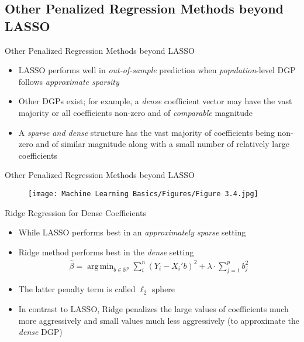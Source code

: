 \documentclass[aspectratio=1610,12pt,xcolor=dvipsnames]{beamer}
\DeclareMathOperator*{\argmin}{arg\,min}
\begin{document}
\subsection{Other Penalized Regression Methods beyond LASSO}

\begin{frame}
  \subsectionpage
\end{frame}

\begin{frame}{Other Penalized Regression Methods beyond LASSO}

\begin{itemize}
    \item LASSO performs well in \textit{out-of-sample} prediction when \textit{population}-level DGP follows \textit{approximate sparsity}
    \item Other DGPs exist; for example, a \textit{dense} coefficient vector may have the vast majority or all coefficients non-zero and of \textit{comparable} magnitude
    \item A \textit{sparse and dense} structure has the vast majority of coefficients being non-zero and of similar magnitude along with a small number of relatively large coefficients
\end{itemize}
\end{frame}

\begin{frame}{Other Penalized Regression Methods beyond LASSO}

\begin{figure}
    \centering
    \texttt{[image: Machine Learning Basics/Figures/Figure 3.4.jpg]}
    \label{fig:figure 3.4}
\end{figure}
\end{frame}

\begin{frame}{Ridge Regression for Dense Coefficients}

\begin{itemize}
    \item While LASSO performs best in an \textit{approximately sparse} setting
    \item Ridge method performs best in the \textit{dense} setting
    \begin{align*}
        \hat \beta = \argmin_{b\in\mathbb{R}^{p}}\sum_i^n(Y_i - X_i'b)^2 + \lambda \cdot \sum_{j=1}^{p}b_j^2
    \end{align*}
    \item The latter penalty term is called $\ell_2$ sphere
    \item In contrast to LASSO, Ridge penalizes the large values of coefficients much more aggressively and small values much less aggressively (to approximate the \textit{dense} DGP)
\end{itemize}
\end{frame}
\end{document}
